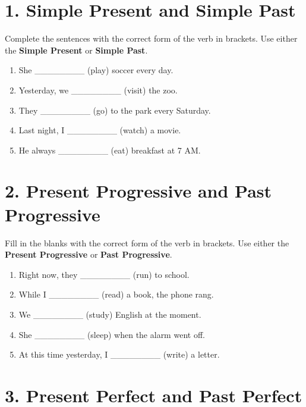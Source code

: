 \section*{1. Simple Present and Simple Past}

Complete the sentences with the correct form of the verb in brackets. Use either the \textbf{Simple Present} or \textbf{Simple Past}.

\begin{enumerate}
    \item She \_\_\_\_\_\_\_\_ (play) soccer every day.
    \item Yesterday, we \_\_\_\_\_\_\_\_ (visit) the zoo.
    \item They \_\_\_\_\_\_\_\_ (go) to the park every Saturday.
    \item Last night, I \_\_\_\_\_\_\_\_ (watch) a movie.
    \item He always \_\_\_\_\_\_\_\_ (eat) breakfast at 7 AM.
\end{enumerate}

\vspace{0.5cm}

\section*{2. Present Progressive and Past Progressive}

Fill in the blanks with the correct form of the verb in brackets. Use either the \textbf{Present Progressive} or \textbf{Past Progressive}.

\begin{enumerate}
    \item Right now, they \_\_\_\_\_\_\_\_ (run) to school.
    \item While I \_\_\_\_\_\_\_\_ (read) a book, the phone rang.
    \item We \_\_\_\_\_\_\_\_ (study) English at the moment.
    \item She \_\_\_\_\_\_\_\_ (sleep) when the alarm went off.
    \item At this time yesterday, I \_\_\_\_\_\_\_\_ (write) a letter.
\end{enumerate}

\vspace{0.5cm}

\section*{3. Present Perfect and Past Perfect}

